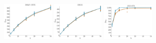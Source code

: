 \documentclass[a4paper]{report}
\newcommand{\wratio}{0.19}
\begin{document}
\includegraphics[width=\wratio\textwidth]{maxcut/DBLP_CITE/fs_dblp_cite}\hfill
\includegraphics[width=\wratio\textwidth]{maxcut/DIGG/fs_digg}\hfill
\vfill
\includegraphics[width=\wratio\textwidth]{maxcut/EGO_FB/fs_ego_fb}\hfill
\end{document}
